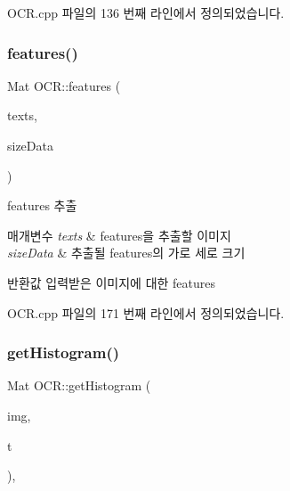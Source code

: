 O\+C\+R.\+cpp 파일의 136 번째 라인에서 정의되었습니다.

\mbox{\label{class_o_c_r_ada88a7c2579124895eb6f19383749e9c}} 
\subsubsection{\texorpdfstring{features()}{features()}}
{\footnotesize\ttfamily Mat O\+C\+R\+::features (\begin{DoxyParamCaption}\item[{const cv\+::\+Mat \&}]{texts,  }\item[{const int}]{size\+Data }\end{DoxyParamCaption})\hspace{0.3cm}{\ttfamily [static]}}



features 추출 


\begin{DoxyParams}{매개변수}
{\em texts} & features을 추출할 이미지 \\
\hline
{\em size\+Data} & 추출될 features의 가로 세로 크기 \\
\hline
\end{DoxyParams}
\begin{DoxyReturn}{반환값}
입력받은 이미지에 대한 features 
\end{DoxyReturn}


O\+C\+R.\+cpp 파일의 171 번째 라인에서 정의되었습니다.

\mbox{\label{class_o_c_r_af4dd76ed4fdaeb65ca3768755d7e3033}} 
\subsubsection{\texorpdfstring{get\+Histogram()}{getHistogram()}}
{\footnotesize\ttfamily Mat O\+C\+R\+::get\+Histogram (\begin{DoxyParamCaption}\item[{const cv\+::\+Mat \&}]{img,  }\item[{const \hyperlink{class_o_c_r_ad50a9d013dc2ee50341eee5b9e326686}{O\+R\+I\+E\+N\+T\+A\+T\+I\+ON}}]{t }\end{DoxyParamCaption})\hspace{0.3cm}{\ttfamily [static]}, {\ttfamily [private]}}



